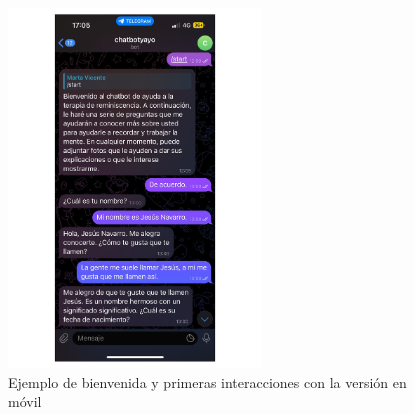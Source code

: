 \begin{figure}[h]
	\centering
	\includegraphics[width=0.6\textwidth]{Imagenes/bienvenidaMovil}
	\caption{Ejemplo de bienvenida y primeras interacciones con la versión en móvil}
	\label{fig:bienvenidaMovil}
\end{figure}






